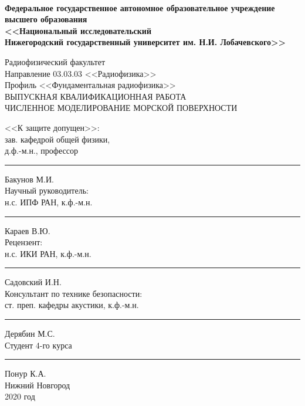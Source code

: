 \documentclass[a4paper,14pt]{extarticle}
\begin{document}
\begin{titlepage}
\begin{spacing}{1}
	\fontsize{11pt}{11pt} \selectfont
	{\centering
	\linespread{1}
	\\[13pt]
	\begin{spacing}{1.5}
		{\fontsize{12pt}{12pt} \selectfont\bf  Федеральное государственное автономное образовательное учреждение \\[-0.27em]
		высшего образования \\[-0.3em]
		<<Национальный исследовательский \\[-0.72em] Нижегородский
		государственный университет им. Н.И. Лобачевского>>
		}\\[4.5pt] 
	\end{spacing}
	\fontsize{12pt}{12pt} \selectfont
	Радиофизический факультет\\[16pt]
	Направление 03.03.03 <<Радиофизика>>\\[5pt]
	Профиль <<Фундаментальная радиофизика>>\\
	\vspace{30pt}
	ВЫПУСКНАЯ КВАЛИФИКАЦИОННАЯ РАБОТА\\
	\vspace{34pt}
	{{
            ЧИСЛЕННОЕ МОДЕЛИРОВАНИЕ МОРСКОЙ ПОВЕРХНОСТИ
	}}\\
	\vspace{34pt}}\fontsize{12pt}{12pt} \selectfont
	\noindent <<К защите допущен>>:\\[15pt]
	зав. кафедрой общей физики,\\[0.4em]
	д.ф.-м.н., профессор\hfill \rule{2cm}{1pt} Бакунов М.И. \hphantom{a\!a}\\[15pt]
	Научный руководитель:\\[0.4em]
	н.с. ИПФ РАН, к.ф.-м.н. \hfill \rule{2cm}{1pt} Караев В.Ю. \hphantom{aa\!a}\\[15pt]
	Рецензент:\\[0.4em]
	н.с. ИКИ РАН, к.ф.-м.н.\hfill \rule{2cm}{1pt}
    Садовский И.Н.\hphantom{\,\,}\\[30pt]
	Консультант по технике безопасности:\\[0.4em]
	ст. преп. кафедры акустики, к.ф.-м.н.\hfill \rule{2cm}{1pt} Дерябин М.С.\hphantom{aa,}\\[15pt]
	Студент 4-го курса \hfill \rule{2cm}{1pt} Понур К.А.
    \hphantom{\,\,\,aaa}\\[15pt]
	\vfill
	\centering
	Нижний Новгород\\[0.4em]
	2020 год
\end{spacing}

\end{titlepage}
\clearpage
\restoregeometry
\end{document}
